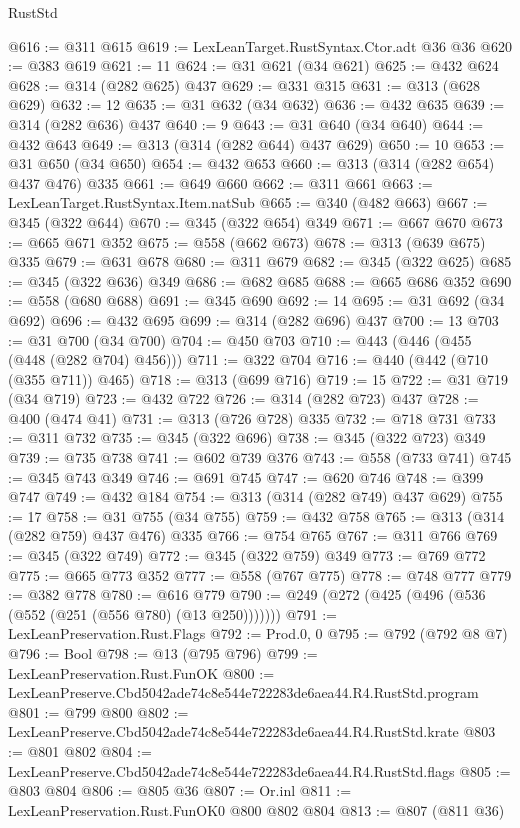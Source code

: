 \begin{lexlean}{RustStd}
\begin{coremodule}
@616 := @311 @615
@619 := LexLeanTarget.RustSyntax.Ctor.adt @36 @36
@620 := @383 @619
@621 := 11
@624 := @31 @621 (@34 @621)
@625 := @432 @624
@628 := @314 (@282 @625) @437
@629 := @331 @315
@631 := @313 (@628 @629)
@632 := 12
@635 := @31 @632 (@34 @632)
@636 := @432 @635
@639 := @314 (@282 @636) @437
@640 := 9
@643 := @31 @640 (@34 @640)
@644 := @432 @643
@649 := @313 (@314 (@282 @644) @437 @629)
@650 := 10
@653 := @31 @650 (@34 @650)
@654 := @432 @653
@660 := @313 (@314 (@282 @654) @437 @476) @335
@661 := @649 @660
@662 := @311 @661
@663 := LexLeanTarget.RustSyntax.Item.natSub
@665 := @340 (@482 @663)
@667 := @345 (@322 @644)
@670 := @345 (@322 @654) @349
@671 := @667 @670
@673 := @665 @671 @352
@675 := @558 (@662 @673)
@678 := @313 (@639 @675) @335
@679 := @631 @678
@680 := @311 @679
@682 := @345 (@322 @625)
@685 := @345 (@322 @636) @349
@686 := @682 @685
@688 := @665 @686 @352
@690 := @558 (@680 @688)
@691 := @345 @690
@692 := 14
@695 := @31 @692 (@34 @692)
@696 := @432 @695
@699 := @314 (@282 @696) @437
@700 := 13
@703 := @31 @700 (@34 @700)
@704 := @450 @703
@710 := @443 (@446 (@455 (@448 (@282 @704) @456)))
@711 := @322 @704
@716 := @440 (@442 (@710 (@355 @711)) @465)
@718 := @313 (@699 @716)
@719 := 15
@722 := @31 @719 (@34 @719)
@723 := @432 @722
@726 := @314 (@282 @723) @437
@728 := @400 (@474 @41)
@731 := @313 (@726 @728) @335
@732 := @718 @731
@733 := @311 @732
@735 := @345 (@322 @696)
@738 := @345 (@322 @723) @349
@739 := @735 @738
@741 := @602 @739 @376
@743 := @558 (@733 @741)
@745 := @345 @743 @349
@746 := @691 @745
@747 := @620 @746
@748 := @399 @747
@749 := @432 @184
@754 := @313 (@314 (@282 @749) @437 @629)
@755 := 17
@758 := @31 @755 (@34 @755)
@759 := @432 @758
@765 := @313 (@314 (@282 @759) @437 @476) @335
@766 := @754 @765
@767 := @311 @766
@769 := @345 (@322 @749)
@772 := @345 (@322 @759) @349
@773 := @769 @772
@775 := @665 @773 @352
@777 := @558 (@767 @775)
@778 := @748 @777
@779 := @382 @778
@780 := @616 @779
@790 := @249 (@272 (@425 (@496 (@536 (@552 (@251 (@556 @780) (@13 @250)))))))
@791 := LexLeanPreservation.Rust.Flags
@792 := Prod.{0, 0}
@795 := @792 (@792 @8 @7)
@796 := Bool
@798 := @13 (@795 @796)
@799 := LexLeanPreservation.Rust.FunOK
@800 := LexLeanPreserve.Cbd5042ade74c8e544e722283de6aea44.R4.RustStd.program
@801 := @799 @800
@802 := LexLeanPreserve.Cbd5042ade74c8e544e722283de6aea44.R4.RustStd.krate
@803 := @801 @802
@804 := LexLeanPreserve.Cbd5042ade74c8e544e722283de6aea44.R4.RustStd.flags
@805 := @803 @804
@806 := @805 @36
@807 := Or.inl
@811 := LexLeanPreservation.Rust.FunOK0 @800 @802 @804
@813 := @807 (@811 @36)

\end{coremodule}
\end{lexlean}
